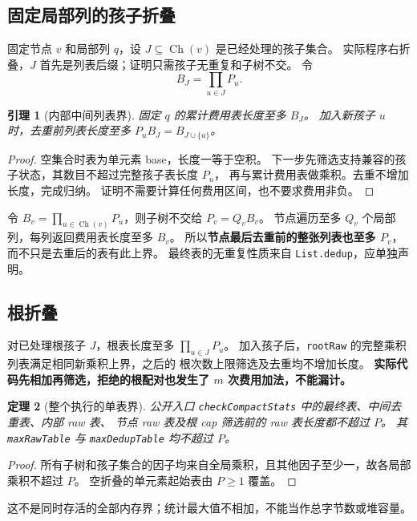 \documentclass[UTF8,a4paper,11pt]{ctexart}
\newtheorem{theorem}{定理}[section]
\newtheorem{lemma}[theorem]{引理}
\theoremstyle{definition}
\newcommand{\ch}{\operatorname{Ch}}
\begin{document}
\subsection{固定局部列的孩子折叠}
固定节点 $v$ 和局部列 $q$，设 $J\subseteq\ch(v)$ 是已经处理的孩子集合。
实际程序右折叠，$J$ 首先是列表后缀；证明只需孩子无重复和子树不交。
令
\[
 B_J=\prod_{u\in J}P_u.
\]
\begin{lemma}[内部中间列表界]
固定 $q$ 的累计费用表长度至多 $B_J$。
加入新孩子 $u$ 时，去重前列表长度至多 $P_u B_J=B_{J\cup\{u\}}$。
\end{lemma}
\begin{proof}
空集合时表为单元素 base，长度一等于空积。
下一步先筛选支持兼容的孩子状态，其数目不超过完整孩子表长度 $P_u$，
再与累计费用表做乘积。去重不增加长度，完成归纳。
证明不需要计算任何费用区间，也不要求费用非负。
\end{proof}

令 $B_v=\prod_{u\in\ch(v)}P_u$，则子树不交给 $P_v=Q_v B_v$。
节点遍历至多 $Q_v$ 个局部列，每列返回费用表长度至多 $B_v$。
所以\textbf{节点最后去重前的整张列表也至多 $P_v$}，而不只是去重后的表有此上界。
最终表的无重复性质来自 \texttt{List.dedup}，应单独声明。

\subsection{根折叠}
对已处理根孩子 $J$，根表长度至多 $\prod_{u\in J}P_u$。
加入孩子后，\texttt{rootRaw} 的完整乘积列表满足相同新乘积上界，之后的
根次数上限筛选及去重均不增加长度。
\textbf{实际代码先相加再筛选，拒绝的根配对也发生了 $m$ 次费用加法，不能漏计。}

\begin{theorem}[整个执行的单表界]
公开入口 \texttt{checkCompactStats} 中的最终表、中间去重表、内部 raw 表、
节点 raw 表及根 cap 筛选前的 raw 表长度都不超过 $P$。
其 \texttt{maxRawTable} 与 \texttt{maxDedupTable} 均不超过 $P$。
\end{theorem}
\begin{proof}
所有子树和孩子集合的因子均来自全局乘积，且其他因子至少一，故各局部乘积不超过 $P$。
空折叠的单元素起始表由 $P\ge1$ 覆盖。
\end{proof}
这不是同时存活的全部内存界；统计最大值不相加，不能当作总字节数或堆容量。
\end{document}
